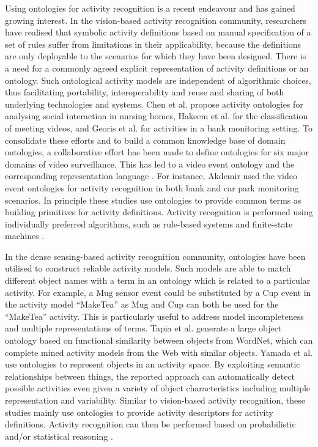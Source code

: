 Using ontologies for activity recognition is a recent endeavour and has gained growing interest. In the vision-based activity recognition community, researchers have realised that symbolic activity definitions based on manual specification of a set of rules suffer from limitations in their applicability, because the definitions are only deployable to the scenarios for which they have been designed. There is a need for a commonly agreed explicit representation of activity definitions or an ontology. Such ontological activity models are independent of algorithmic choices, thus facilitating portability, interoperability and reuse and sharing of both underlying technologies and systems. Chen et al. \cite{Chen2004} propose activity ontologies for analysing social interaction in nursing homes, Hakeem et al. \cite{Hakeem2004} for the classification of meeting videos, and Georis et al. \cite{Georis2004} for activities in a bank monitoring setting. To consolidate these efforts and to build a common knowledge base of domain ontologies, a collaborative effort has been made to define ontologies for six major domains of video surveillance. This has led to a video event ontology \cite{Nevatia2004} and the corresponding representation language \cite{Francois2005}. For instance, Akdemir \cite{Akdemir2008} used the video event ontologies for activity recognition in both bank and car park monitoring scenarios. In principle these studies use ontologies to provide common terms as building primitives for activity definitions. Activity recognition is performed using individually preferred algorithms, such as rule-based systems \cite{Hakeem2004} and finite-state machines \cite{Akdemir2008}. 

In the dense sensing-based activity recognition community, ontologies have been utilised to construct reliable activity models. Such models are able to match different object names with a term in an ontology which is related to a particular activity. For example, a Mug sensor event could be substituted by a Cup event in the activity model “MakeTea” as Mug and Cup can both be used for the “MakeTea” activity. This is particularly useful to address model incompleteness and multiple representations of terms. Tapia et al. \cite{Tapia2006} generate a large object ontology based on functional similarity between objects from WordNet, which can complete mined activity models from the Web with similar objects. Yamada et al. \cite{Yamada2007} use ontologies to represent objects in an activity space. By exploiting semantic relationships between things, the reported approach can automatically detect possible activities even given a variety of object characteristics including multiple representation and variability. Similar to vision-based activity recognition, these studies mainly use ontologies to provide activity descriptors for activity definitions. Activity recognition can then be performed based on probabilistic and/or statistical reasoning \cite{Tapia2006} \cite{Yamada2007}.

